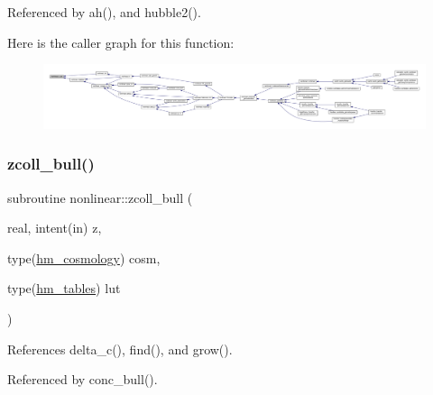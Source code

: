 Referenced by ah(), and hubble2().

Here is the caller graph for this function\+:
\nopagebreak
\begin{figure}[H]
\begin{center}
\leavevmode
\includegraphics[width=350pt]{namespacenonlinear_a316db4addf8f1f544ab3c08ba97fbeb9_icgraph}
\end{center}
\end{figure}
\mbox{\label{namespacenonlinear_a53b6da6e807b30b0078e77b9900c33b6}} 
\subsubsection{\texorpdfstring{zcoll\+\_\+bull()}{zcoll\_bull()}}
{\footnotesize\ttfamily subroutine nonlinear\+::zcoll\+\_\+bull (\begin{DoxyParamCaption}\item[{real, intent(in)}]{z,  }\item[{type(\mbox{\hyperlink{structnonlinear_1_1hm__cosmology}{hm\+\_\+cosmology}})}]{cosm,  }\item[{type(\mbox{\hyperlink{structnonlinear_1_1hm__tables}{hm\+\_\+tables}})}]{lut }\end{DoxyParamCaption})\hspace{0.3cm}{\ttfamily [private]}}



References delta\+\_\+c(), find(), and grow().



Referenced by conc\+\_\+bull().

